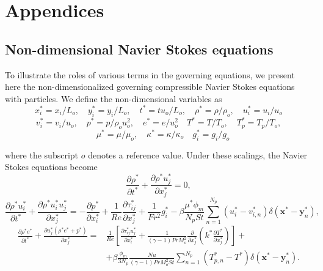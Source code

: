 \documentclass[a4paper,10pt]{report}
\begin{document}
\clearpage
\section*{Appendices}

\subsection*{Non-dimensional Navier Stokes equations}

To illustrate the roles of various terms in the governing equations, we present here the non-dimensionalized governing compressible Navier Stokes equations with particles. We define the non-dimensional variables as
\begin{equation}
x_i^*=x_i/L_o, \quad y_i^*=y_i/L_o, \quad t^*=tu_o/L_o, \quad \rho^*=\rho/\rho_o, \quad u_i^*=u_i/u_o	
\end{equation}
\begin{equation}
v_i^*=v_i/u_o, \quad p^*=p/\rho_o u_o^2, \quad e^*=e/u_o^2 \quad T^*=T/T_o, \quad T_p^* = T_p / T_o, 
\end{equation}
\begin{equation}
\quad \mu^* = \mu / \mu_o, \quad \kappa^* = \kappa / \kappa_o \quad g^*_i = g_i / g_o	
\end{equation}

where the subscript $o$ denotes a reference value. Under these scalings, the Navier Stokes equations become
\begin{equation}
\label{eq:NS_cont_nd}
\frac{\partial \rho^*}{\partial t^*} + \frac{\partial \rho^* u_j^*}{\partial x_j^*} = 0,	
\end{equation}
\begin{equation}
\label{eq:NS_mom_nd}
\frac{\partial \rho^* u_i^*}{\partial t^*} + \frac{\partial \rho^* u_i^* u_j^*}{\partial x_j^*} = - \frac{\partial p^*}{\partial x_i^*} + \frac{1}{Re}\frac{\partial \tau_{ij}^*}{\partial x_j^*} + \frac{1}{Fr^2} g_i^* - \beta\frac{\mu^* \phi_m}{N_p St}  \sum_{n=1}^{N_p} (u_i^*-v_{i,n}^*)\delta(\mathbf{x}^* - \mathbf{y}_n^* ),	
\end{equation}
\begin{equation}
\label{eq:NS_en_nd}
\begin{split}
\frac{\partial \rho^* e^*}{\partial t^*} + \frac{\partial u_j^* (\rho^* e^* + p^*)}{\partial x_j^*} = & \frac{1}{Re}\left[\frac{\partial \tau_{ij}^* u_j^*}{\partial x_i^*} + \frac{1}{(\gamma-1)Pr M_o^2}\frac{\partial}{\partial x_j^*}\left( k^* \frac{\partial T^*}{\partial x_j^*}\right)\right]+ \\
& + \beta \frac{\phi_m}{3N_p} \frac{Nu}{(\gamma-1)Pr M_o^2St}\sum_{n=1}^{N_p} (T_{p,n}^* - T^*) \delta(\mathbf{x}^* - \mathbf{y}_n^* ).
\end{split}
\end{equation}
\end{document}
